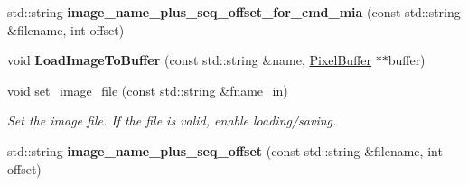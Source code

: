 \begin{DoxyCompactItemize}
\item 
std\+::string {\bfseries image\+\_\+name\+\_\+plus\+\_\+seq\+\_\+offset\+\_\+for\+\_\+cmd\+\_\+mia} (const std\+::string \&filename, int offset)\hypertarget{classimage__tools_1_1MIAIOManager_a3dc82ed7a8d237ef9a371055fa8ef175}{}\label{classimage__tools_1_1MIAIOManager_a3dc82ed7a8d237ef9a371055fa8ef175}

\item 
void {\bfseries Load\+Image\+To\+Buffer} (const std\+::string \&name, \hyperlink{classimage__tools_1_1PixelBuffer}{Pixel\+Buffer} $\ast$$\ast$buffer)\hypertarget{classimage__tools_1_1MIAIOManager_a1ffdb8cf4f396ed10f0db4fd0ba77947}{}\label{classimage__tools_1_1MIAIOManager_a1ffdb8cf4f396ed10f0db4fd0ba77947}

\item 
void \hyperlink{classimage__tools_1_1MIAIOManager_a209180ddcfe3bf43d8fd7c6635391ea4}{set\+\_\+image\+\_\+file} (const std\+::string \&fname\+\_\+in)
\begin{DoxyCompactList}\small\item\em Set the image file. If the file is valid, enable loading/saving. \end{DoxyCompactList}\item 
std\+::string {\bfseries image\+\_\+name\+\_\+plus\+\_\+seq\+\_\+offset} (const std\+::string \&filename, int offset)\hypertarget{classimage__tools_1_1MIAIOManager_ada4fae71b72e3a28ba40ffbc24ef8683}{}\label{classimage__tools_1_1MIAIOManager_ada4fae71b72e3a28ba40ffbc24ef8683}

\end{DoxyCompactItemize}
